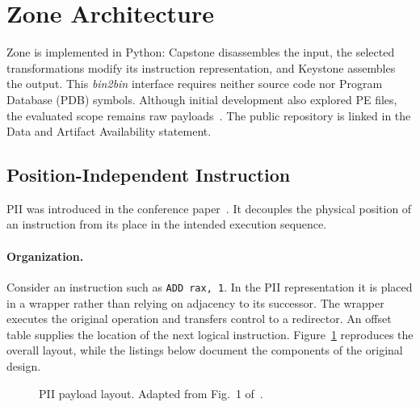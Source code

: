 \documentclass[runningheads]{llncs}
\providecommand{\Description}[1]{}
\begin{document}
\section{Zone Architecture}\label{sec:developing_meth}
Zone is implemented in Python: Capstone disassembles the input, the
selected transformations modify its instruction representation, and
Keystone assembles the output. This \emph{bin2bin} interface requires
neither source code nor Program Database (PDB) symbols. Although initial
development also explored PE files, the evaluated scope remains raw
payloads~\cite{zone_secrypt_2026}. The public repository is linked in the
Data and Artifact Availability statement.

\subsection{Position-Independent Instruction}\label{sec:pii}
PII was introduced in the conference paper~\cite{zone_secrypt_2026}. It decouples the physical position of an instruction from its place in the intended execution sequence.

\paragraph{Organization.}
Consider an instruction such as \texttt{ADD rax, 1}. In the PII representation it is placed in a wrapper rather than relying on adjacency to its successor. The wrapper executes the original operation and transfers control to a redirector. An offset table supplies the location of the next logical instruction. Figure~\ref{fig:pii_layout} reproduces the overall layout, while the listings below document the components of the original design.

\begin{figure}[t]
\centering
{}
\Description{A schematic separates the initial call, instruction wrappers, redirector components, padding, offset information, and memory region.}
\caption{PII payload layout. Adapted from Fig.~1 of~\cite{zone_secrypt_2026}.}
\label{fig:pii_layout}
\end{figure}
\end{document}
